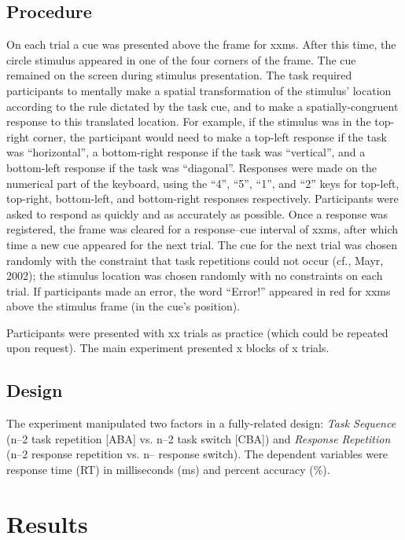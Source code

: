 \documentclass[a4paper, jou, natbib]{apa6}
\begin{document}
\subsection{Procedure}
On each trial a cue was presented above the frame for xxms. After this time, the circle stimulus appeared in one of the four corners of the frame. The cue remained on the screen during stimulus presentation. The task required participants to mentally make a spatial transformation of the stimulus' location according to the rule dictated by the task cue, and to make a spatially-congruent response to this translated location. For example, if the stimulus was in the top-right corner, the participant would need to make a top-left response if the task was ``horizontal'', a bottom-right response if the task was ``vertical'', and a bottom-left response if the task was ``diagonal''. Responses were made on the numerical part of the keyboard, using the ``4'', ``5'', ``1'', and ``2'' keys for top-left, top-right, bottom-left, and bottom-right responses respectively. Participants were asked to respond as quickly and as accurately as possible. Once a response was registered, the frame was cleared for a response--cue interval of xxms, after which time a new cue appeared for the next trial. The cue for the next trial was chosen randomly with the constraint that task repetitions could not occur (cf., Mayr, 2002); the stimulus location was chosen randomly with no constraints on each trial. If participants made an error, the word ``Error!'' appeared in red for xxms above the stimulus frame (in the cue's position).

Participants were presented with xx trials as practice (which could be repeated upon request). The main experiment presented x blocks of x trials. 

\subsection{Design}
The experiment manipulated two factors in a fully-related design: \emph{Task Sequence} (n--2 task repetition [ABA] vs. n--2 task switch [CBA]) and \emph{Response Repetition} (n--2 response repetition vs. n-- response switch). The dependent variables were response time (RT) in milliseconds (ms) and percent accuracy (\%).


\section{Results}
\end{document}
